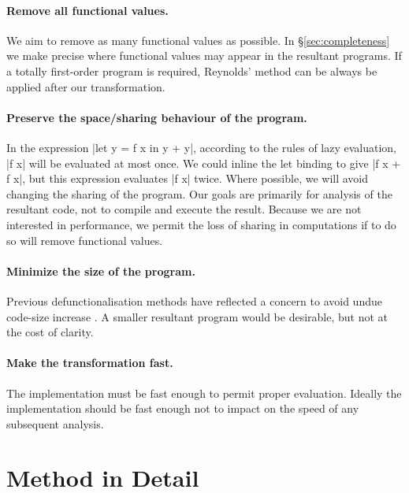 \documentclass[preprint]{sigplanconf}
\begin{document}
\paragraph{Remove all functional values.} We aim to remove as many functional values as possible. In \S\ref{sec:completeness} we make precise where functional values may appear in the resultant programs. If a totally first-order program is required, Reynolds' method can be always be applied after our transformation.

\paragraph{Preserve the space/sharing behaviour of the program.} In the expression |let y = f x in y + y|, according to the rules of lazy evaluation, |f x| will be evaluated at most once. We could inline the let binding to give |f x + f x|, but this expression evaluates |f x| twice. Where possible, we will avoid changing the sharing of the program. Our goals are primarily for analysis of the resultant code, not to compile and execute the result. Because we are not interested in performance, we permit the loss of sharing in computations if to do so will remove functional values.

\paragraph{Minimize the size of the program.} Previous defunctionalisation methods have reflected a concern to avoid undue code-size increase \cite{chin:higher_order_removal}. A smaller resultant program would be desirable, but not at the cost of clarity.

\paragraph{Make the transformation fast.} The implementation must be fast enough to permit proper evaluation. Ideally the implementation should be fast enough not to impact on the speed of any subsequent analysis.


\section{Method in Detail}
\label{sec:detailed}

\begin{comment}
\begin{code}
data Prog = Prog deriving Eq
simplify,arity,inline,specialise :: Prog -> Prog
\end{code}
\end{comment}
\end{document}
